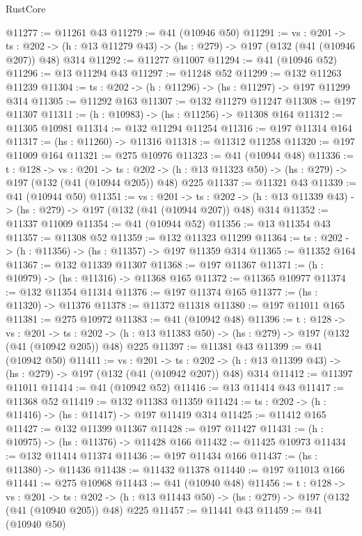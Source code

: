 \begin{lexlean}{RustCore}
\begin{coremodule}
@11277 := @11261 @43
@11279 := @41 (@10946 @50)
@11291 := {vs : @201} ->
  {ts : @202} -> (h : @13 @11279 @43) -> (hs : @279) -> @197 (@132 (@41 (@10946 @207)) @48) @314
@11292 := @11277 @11007
@11294 := @41 (@10946 @52)
@11296 := @13 @11294 @43
@11297 := @11248 @52
@11299 := @132 @11263 @11239
@11304 := {ts : @202} -> (h : @11296) -> (hs : @11297) -> @197 @11299 @314
@11305 := @11292 @163
@11307 := @132 @11279 @11247
@11308 := @197 @11307
@11311 := (h : @10983) -> (hs : @11256) -> @11308 @164
@11312 := @11305 @10981
@11314 := @132 @11294 @11254
@11316 := @197 @11314 @164
@11317 := (hs : @11260) -> @11316
@11318 := @11312 @11258
@11320 := @197 @11009 @164
@11321 := @275 @10976
@11323 := @41 (@10944 @48)
@11336 := {t : @128} ->
  {vs : @201} ->
  {ts : @202} -> (h : @13 @11323 @50) -> (hs : @279) -> @197 (@132 (@41 (@10944 @205)) @48) @225
@11337 := @11321 @43
@11339 := @41 (@10944 @50)
@11351 := {vs : @201} ->
  {ts : @202} -> (h : @13 @11339 @43) -> (hs : @279) -> @197 (@132 (@41 (@10944 @207)) @48) @314
@11352 := @11337 @11009
@11354 := @41 (@10944 @52)
@11356 := @13 @11354 @43
@11357 := @11308 @52
@11359 := @132 @11323 @11299
@11364 := {ts : @202} -> (h : @11356) -> (hs : @11357) -> @197 @11359 @314
@11365 := @11352 @164
@11367 := @132 @11339 @11307
@11368 := @197 @11367
@11371 := (h : @10979) -> (hs : @11316) -> @11368 @165
@11372 := @11365 @10977
@11374 := @132 @11354 @11314
@11376 := @197 @11374 @165
@11377 := (hs : @11320) -> @11376
@11378 := @11372 @11318
@11380 := @197 @11011 @165
@11381 := @275 @10972
@11383 := @41 (@10942 @48)
@11396 := {t : @128} ->
  {vs : @201} ->
  {ts : @202} -> (h : @13 @11383 @50) -> (hs : @279) -> @197 (@132 (@41 (@10942 @205)) @48) @225
@11397 := @11381 @43
@11399 := @41 (@10942 @50)
@11411 := {vs : @201} ->
  {ts : @202} -> (h : @13 @11399 @43) -> (hs : @279) -> @197 (@132 (@41 (@10942 @207)) @48) @314
@11412 := @11397 @11011
@11414 := @41 (@10942 @52)
@11416 := @13 @11414 @43
@11417 := @11368 @52
@11419 := @132 @11383 @11359
@11424 := {ts : @202} -> (h : @11416) -> (hs : @11417) -> @197 @11419 @314
@11425 := @11412 @165
@11427 := @132 @11399 @11367
@11428 := @197 @11427
@11431 := (h : @10975) -> (hs : @11376) -> @11428 @166
@11432 := @11425 @10973
@11434 := @132 @11414 @11374
@11436 := @197 @11434 @166
@11437 := (hs : @11380) -> @11436
@11438 := @11432 @11378
@11440 := @197 @11013 @166
@11441 := @275 @10968
@11443 := @41 (@10940 @48)
@11456 := {t : @128} ->
  {vs : @201} ->
  {ts : @202} -> (h : @13 @11443 @50) -> (hs : @279) -> @197 (@132 (@41 (@10940 @205)) @48) @225
@11457 := @11441 @43
@11459 := @41 (@10940 @50)

\end{coremodule}
\end{lexlean}
